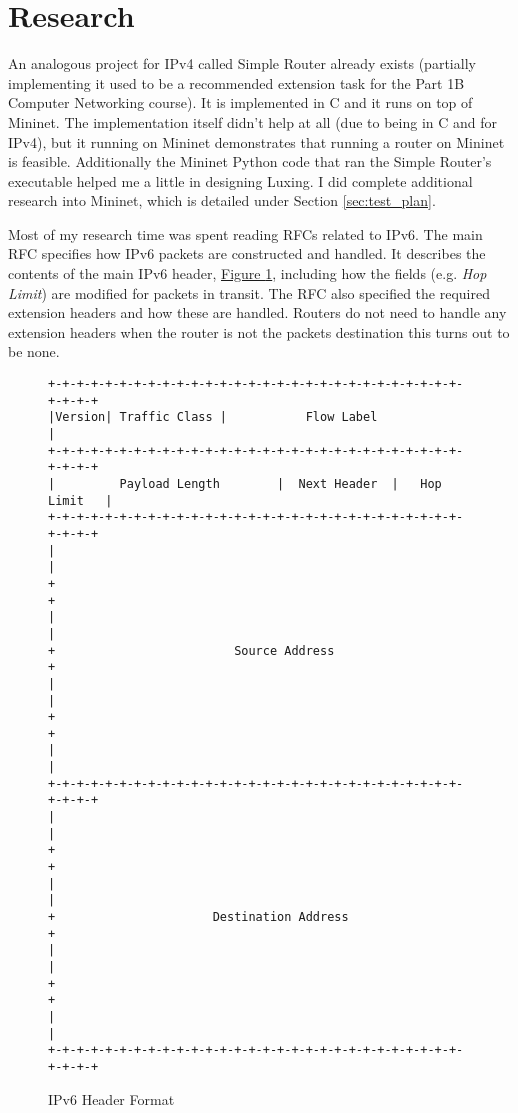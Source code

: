 \documentclass[12pt,a4paper,twoside,openright]{report}
\begin{document}
\section{Research}
An analogous project for IPv4 called Simple Router already exists\cite{simple_router} (partially implementing it used to be a recommended extension task for the Part 1B Computer Networking course).  It is implemented in C and it runs on top of Mininet.  The implementation itself didn't help at all (due to being in C and for IPv4), but it running on Mininet demonstrates that running a router on Mininet is feasible.  Additionally the Mininet Python code that ran the Simple Router's executable helped me a little in designing Luxing.  I did complete additional research into Mininet, which is detailed under Section \ref{sec:test_plan}.

\bigskip

Most of my research time was spent reading RFCs related to IPv6.  The main RFC\cite{ipv6_rfc} specifies how IPv6 packets are constructed and handled. It describes the contents of the main IPv6 header, \hyperref[fig::ipv6_header]{Figure }\ref{fig::ipv6_header}, including how the fields (e.g. \textit{Hop Limit}) are modified for packets in transit. The RFC also specified the required extension headers and how these are handled. Routers do not need to handle any extension headers when the router is not the packets destination this turns out to be none. 

\begin{figure}
\centering
\begin{varwidth}{\linewidth}
\begin{verbatim}
+-+-+-+-+-+-+-+-+-+-+-+-+-+-+-+-+-+-+-+-+-+-+-+-+-+-+-+-+-+-+-+-+
|Version| Traffic Class |           Flow Label                  |
+-+-+-+-+-+-+-+-+-+-+-+-+-+-+-+-+-+-+-+-+-+-+-+-+-+-+-+-+-+-+-+-+
|         Payload Length        |  Next Header  |   Hop Limit   |
+-+-+-+-+-+-+-+-+-+-+-+-+-+-+-+-+-+-+-+-+-+-+-+-+-+-+-+-+-+-+-+-+
|                                                               |
+                                                               +
|                                                               |
+                         Source Address                        +
|                                                               |
+                                                               +
|                                                               |
+-+-+-+-+-+-+-+-+-+-+-+-+-+-+-+-+-+-+-+-+-+-+-+-+-+-+-+-+-+-+-+-+
|                                                               |
+                                                               +
|                                                               |
+                      Destination Address                      +
|                                                               |
+                                                               +
|                                                               |
+-+-+-+-+-+-+-+-+-+-+-+-+-+-+-+-+-+-+-+-+-+-+-+-+-+-+-+-+-+-+-+-+
\end{verbatim}
\end{varwidth}
\caption{IPv6 Header Format\cite{ipv6_rfc}}
\label{fig::ipv6_header}
\end{figure}
\end{document}
